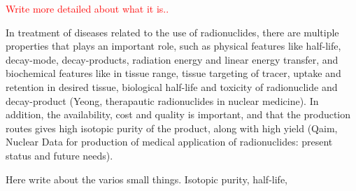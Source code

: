 \textcolor{red}{Write more detailed about what it is..}

In treatment of diseases related to the use of radionuclides, there are multiple properties that plays an important role, such as physical features like half-life, decay-mode, decay-products, radiation energy and linear energy transfer, and biochemical features like in tissue range, tissue targeting of tracer, uptake and retention in desired tissue, biological half-life and toxicity of radionuclide and decay-product (Yeong, therapautic radionuclides in nuclear medicine). In addition, the availability, cost and quality is important, and that the production routes gives high isotopic purity of the product, along with high yield (Qaim, Nuclear Data for production of medical application of radionuclides: present status and future needs). 


Here write about the varios small things. Isotopic purity, half-life, 


\subsection*{}
\noindent 

